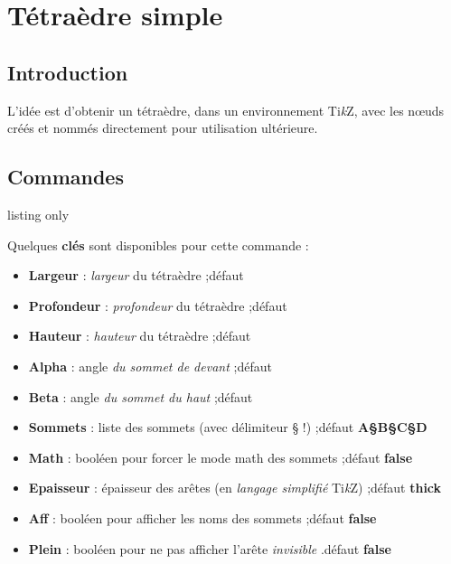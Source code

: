 \documentclass[a4paper,french,11pt]{article}
\providecommand\tikzlogo{Ti\textit{k}Z}
\let\TikZ\tikzlogo
\newcommand\Cle[1]{{\bfseries\sffamily\textlangle #1\textrangle}}
\begin{document}
\newpage

\section{Tétraèdre \og simple \fg}\label{tetra}

\subsection{Introduction}

\begin{tipblock}
L'idée est d'obtenir un tétraèdre, dans un environnement \TikZ, avec les nœuds créés et nommés directement pour utilisation ultérieure.
\end{tipblock}

\subsection{Commandes}

\begin{PresCodeTexPL}{listing only}
\end{PresCodeTexPL}

\begin{cautionblock}
Quelques \Cle{clés} sont disponibles pour cette commande :

\begin{itemize}
	\item \Cle{Largeur} : \textit{largeur} du tétraèdre ;\hfill{}défaut \Cle{4}
	\item \Cle{Profondeur} : \textit{profondeur} du tétraèdre ;\hfill{}défaut \Cle{1.25}
	\item \Cle{Hauteur} : \textit{hauteur} du tétraèdre ;\hfill{}défaut \Cle{3}
	\item \Cle{Alpha} : angle \textit{du sommet de devant} ;\hfill{}défaut \Cle{40}
	\item \Cle{Beta} : angle \textit{du sommet du haut} ;\hfill{}défaut \Cle{60}
	\item \Cle{Sommets} : liste des sommets (avec délimiteur § !) ;\hfill{}défaut \Cle{A§B§C§D}
	\item \Cle{Math} : booléen pour forcer le mode math des sommets ;\hfill{}défaut \Cle{false}
	\item \Cle{Epaisseur} : épaisseur des arêtes (en \textit{langage simplifié} \TikZ) ;\hfill{}défaut \Cle{thick}
	\item \Cle{Aff} : booléen pour afficher les noms des sommets ;\hfill{}défaut \Cle{false}
	\item \Cle{Plein} : booléen pour ne pas afficher l'arête \textit{invisible} .\hfill{}défaut \Cle{false}
\end{itemize}
\vspace*{-\baselineskip}\leavevmode
\end{cautionblock}
\end{document}
